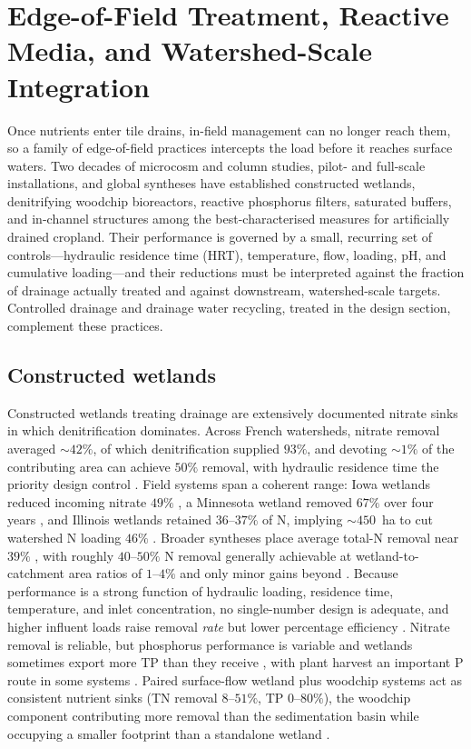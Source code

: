 \documentclass[11pt]{article}
\begin{document}
\section*{Edge-of-Field Treatment, Reactive Media, and Watershed-Scale Integration}

Once nutrients enter tile drains, in-field management can no longer reach
them, so a family of edge-of-field practices intercepts the load before it
reaches surface waters. Two decades of microcosm and column studies,
pilot- and full-scale installations, and global syntheses have established
constructed wetlands, denitrifying woodchip bioreactors, reactive
phosphorus filters, saturated buffers, and in-channel structures among the
best-characterised measures for artificially drained cropland. Their
performance is governed by a small, recurring set of controls---hydraulic
residence time (HRT), temperature, flow, loading, pH, and cumulative
loading---and their reductions must be interpreted against the fraction of
drainage actually treated and against downstream, watershed-scale targets.
Controlled drainage and drainage water recycling, treated in the design
section, complement these practices.

\subsection{Constructed wetlands}

Constructed wetlands treating drainage are extensively documented nitrate
sinks in which denitrification dominates. Across French watersheds, nitrate
removal averaged $\sim42\%$, of which denitrification supplied $93\%$, and
devoting $\sim1\%$ of the contributing area can achieve $50\%$ removal, with
hydraulic residence time the priority design control \parencite{Tournebize2017}.
Field systems span a coherent range: Iowa wetlands reduced incoming nitrate
$49\%$ \parencite{Drake2018}, a Minnesota wetland removed $67\%$ over four
years \parencite{Gordon2021}, and Illinois wetlands retained $36$--$37\%$ of
N, implying $\sim450$~ha to cut watershed N loading $46\%$
\parencite{Kovacic2006}. Broader syntheses place average total-N removal near
$39\%$ \parencite{Wang2025b}, with roughly $40$--$50\%$ N removal generally
achievable at wetland-to-catchment area ratios of $1$--$4\%$ and only minor
gains beyond \parencite{Mendes2021}. Because performance is a strong function
of hydraulic loading, residence time, temperature, and inlet concentration,
no single-number design is adequate, and higher influent loads raise removal
\emph{rate} but lower percentage efficiency
\parencite{Kadlec2012,Steidl2019,Mendes2021}. Nitrate removal is reliable, but
phosphorus performance is variable and wetlands sometimes export more TP than
they receive \parencite{Tanner2005,Tanner2011,Messer2021}, with plant harvest
an important P route in some systems \parencite{Lenhart2016}. Paired
surface-flow wetland plus woodchip systems act as consistent nutrient sinks
(TN removal $8$--$51\%$, TP $0$--$80\%$), the woodchip component contributing
more removal than the sedimentation basin while occupying a smaller footprint
than a standalone wetland \parencite{Pugliese2020}.
\end{document}
